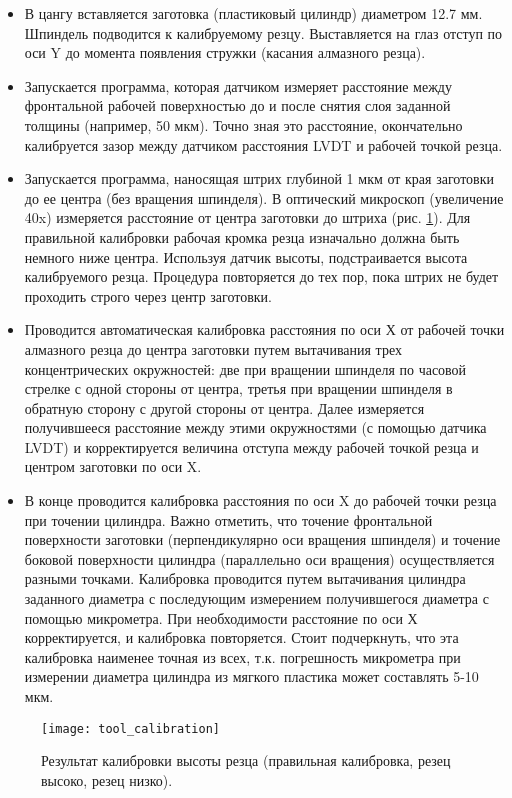 \begin{itemize}
    \item В цангу вставляется заготовка (пластиковый цилиндр) диаметром 12.7 мм. Шпиндель подводится к калибруемому резцу. Выставляется на глаз отступ по оси Y до момента появления стружки (касания алмазного резца).
    \item Запускается программа, которая датчиком измеряет расстояние между фронтальной рабочей поверхностью до и после снятия слоя заданной толщины (например, 50 мкм). Точно зная это расстояние, окончательно калибруется зазор между датчиком расстояния LVDT и рабочей точкой резца.
    \item Запускается программа, наносящая штрих глубиной 1 мкм от края заготовки до ее центра (без вращения шпинделя). В оптический микроскоп (увеличение 40x) измеряется расстояние от центра заготовки до штриха (рис. \ref{tool_calibration}). Для правильной калибровки рабочая кромка резца изначально должна быть немного ниже центра. Используя датчик высоты, подстраивается высота калибруемого резца. Процедура повторяется до тех пор, пока штрих не будет проходить строго через центр заготовки.
    \item Проводится автоматическая калибровка расстояния по оси Х от рабочей точки алмазного резца до центра заготовки путем вытачивания трех концентрических окружностей: две при вращении шпинделя по часовой стрелке с одной стороны от центра, третья при вращении шпинделя в обратную сторону с другой стороны от центра. Далее измеряется получившееся расстояние между этими окружностями (с помощью датчика LVDT) и корректируется величина отступа между рабочей точкой резца и центром заготовки по оси X.
    \item В конце проводится калибровка расстояния по оси X до рабочей точки резца при точении цилиндра. Важно отметить, что точение фронтальной поверхности заготовки (перпендикулярно оси вращения шпинделя) и точение боковой поверхности цилиндра (параллельно оси вращения) осуществляется разными точками. Калибровка проводится путем вытачивания цилиндра заданного диаметра с последующим измерением получившегося диаметра с помощью микрометра. При необходимости расстояние по оси Х корректируется, и калибровка повторяется. Стоит подчеркнуть, что эта калибровка наименее точная из всех, т.к. погрешность микрометра при измерении диаметра цилиндра из мягкого пластика может составлять 5-10 мкм.
\end{itemize}


\begin{figure}[ht]
    \centering
  \texttt{[image: tool\_calibration]}
  \caption{Результат калибровки высоты резца (правильная калибровка, резец высоко, резец низко).}
  \label{tool_calibration}
\end{figure}

